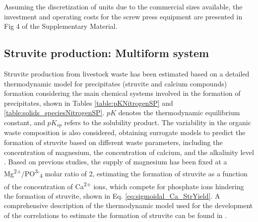 \begin{refsection}[referencesApD]
Assuming the discretization of units due to the commercial sizes available, the investment and operating costs for the screw press equipment are presented in Fig 4 of the Supplementary Material.

\subsection{Struvite production: Multiform system}
Struvite production from livestock waste has been estimated based on a detailed thermodynamic model for precipitates (struvite and calcium compounds) formation considering the main chemical systems involved in the formation of precipitates, shown in Tables \ref{table:pKNitrogenSP} and \ref{table:solids_speciesNitrogenSP}. $pK$ denotes the thermodynamic equilibrium constant, and $pK_{sp}$ refers to the solubility product. The variability in the organic waste composition is also considered, obtaining surrogate models to predict the formation of struvite based on different waste parameters, including the concentration of magnesium, the concentration of calcium, and the alkalinity level \citep{martin2020model}. Based on previous studies, the supply of magnesium has been fixed at a Mg\textsuperscript{2+}/PO\textsuperscript{3-}\textsubscript{4} molar ratio of 2, estimating the formation of struvite as a function of the concentration of Ca\textsuperscript{2+} ions, which compete for phosphate ions hindering the formation of struvite, shown in Eq. \ref{eq:sigmoidal_Ca_StrYield}. A comprehensive description of the thermodynamic model used for the development of the correlations to estimate the formation of struvite can be found in \citet{martin2020model}.


\end{refsection}
